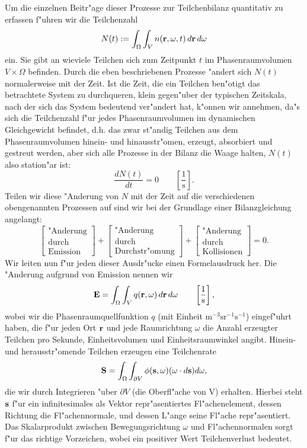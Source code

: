 \documentclass[11pt,a4paper,DIVcalc,BCOR8mm,titlepage,twoside]{scrartcl}
\begin{document}
	Um die einzelnen Beitr"age dieser Prozesse zur Teilchenbilanz quantitativ zu erfassen f"uhren wir die Teilchenzahl $$N(t):=\int_\Omega \int_V n(\mathbf{r},\omega,t)\,d\mathbf{r}\,d\omega$$ ein. Sie gibt an wieviele Teilchen sich zum Zeitpunkt $t$ im Phasenraumvolumen $V \times \Omega$ befinden. Durch die eben beschriebenen Prozesse "andert sich $N(t)$ normalerweise mit der Zeit. Ist die Zeit, die ein Teilchen ben"otigt das betrachtete System zu durchqueren, klein gegen"uber der typischen Zeitskala, nach der sich das System bedeutend ver"andert hat, k"onnen wir annehmen, da"s sich die Teilchenzahl f"ur jedes Phasenraumvolumen im dynamischen Gleichgewicht befindet, d.h. das zwar st"andig Teilchen aus dem Phasenraumvolumen hinein- und hinausstr"omen, erzeugt, absorbiert und gestreut werden, aber sich alle Prozesse in der Bilanz die Waage halten, $N(t)$ also station"ar ist:$$\frac{dN(t)}{dt}=0\qquad\left[\frac{1}{\text{s}}\right].$$ Teilen wir diese "Anderung von $N$ mit der Zeit auf die verschiedenen obengenannten Prozessen auf sind wir bei der Grundlage einer Bilanzgleichung angelangt:$$\begin{bmatrix}\text{"Anderung}\\ \text{durch}\\ \text{Emission}\end{bmatrix}+\begin{bmatrix}\text{"Anderung}\\ \text{durch}\\ \text{Durchstr"omung}\end{bmatrix}+\begin{bmatrix}\text{"Anderung}\\ \text{durch}\\ \text{Kollisionen}\end{bmatrix}=0.$$ Wir leiten nun f"ur jeden dieser Ausdr"ucke einen Formelausdruck her.
	Die "Anderung aufgrund von Emission nennen wir $$\mathbf{E}=\int_\Omega \int_V q(\mathbf{r},\omega)\,d\mathbf{r}\,d\omega\qquad\left[\frac{1}{\text{s}}\right],$$ wobei wir die Phasenraumquellfunktion $q$ (mit Einheit $\text{m}^{-3}\text{sr}^{-1}\text{s}^{-1}$) eingef"uhrt haben, die f"ur jeden Ort $\mathbf{r}$ und jede Raumrichtung $\omega$ die Anzahl erzeugter Teilchen pro Sekunde, Einheitsvolumen und Einheitsraumwinkel angibt. Hinein- und herausstr"omende Teilchen erzeugen eine Teilchenrate
	$$\mathbf{S}=\int_\Omega \int_{\partial V} \phi(\mathbf{s},\omega)(\omega \cdot d\mathbf{s})d\omega,$$
	die wir durch Integrieren "uber $\partial V$ (die Oberfl"ache von V) erhalten. Hierbei steht $\mathbf{s}$ f"ur ein infinitesimales als Vektor repr"asentiertes Fl"achenelement, dessen Richtung die Fl"achennormale, und dessen L"ange seine Fl"ache repr"asentiert. Das Skalarprodukt zwischen Bewegungsrichtung $\omega$ und Fl"achennormalen sorgt f"ur das richtige Vorzeichen, wobei ein positiver Wert Teilchenverlust bedeutet.
\end{document}
